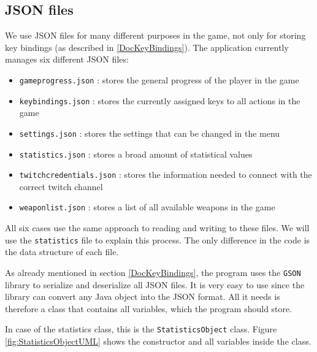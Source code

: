 \documentclass[12p]{article}
\begin{document}

\newpage
\subsection{JSON files} \label{DocJSONfiles}

We use JSON files for many different purposes in the game, not only for storing key bindings (as described in \ref{DocKeyBindings}). The application currently manages six different JSON files: 

\begin{itemize}
    \item[\faFile] \texttt{gameprogress.json} : stores the general progress of the player in the game
    \item[\faFile] \texttt{keybindings.json} : stores the currently assigned keys to all actions in the game
    \item[\faFile] \texttt{settings.json} : stores the settings that can be changed in the menu
    \item[\faFile] \texttt{statistics.json} : stores a broad amount of statistical values
    \item[\faFile] \texttt{twitchcredentials.json} : stores the information needed to connect with the correct twitch channel
    \item[\faFile] \texttt{weaponlist.json} : stores a list of all available weapons in the game
\end{itemize}

All six cases use the same approach to reading and writing to these files. We will use the \texttt{statistics} file to explain this process. The only difference in the code is the data structure of each file.

As already mentioned in section \ref{DocKeyBindings}, the program uses the \texttt{GSON} library to serialize and deserialize all JSON files. It is very easy to use since the library can convert any Java object into the JSON format. All it needs is therefore a class that contains all variables, which the program should store.

In case of the statistics class, this is the \texttt{StatisticsObject} class. Figure \ref{fig:StatisticsObjectUML} shows the constructor and all variables inside the class.
\end{document}
